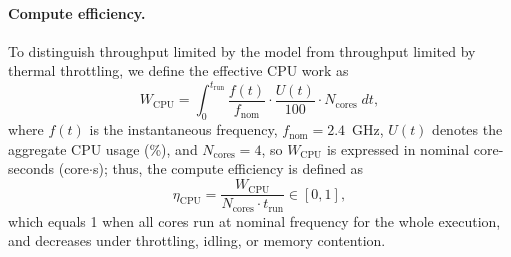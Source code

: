 \documentclass[acmsmall,natbib=false]{acmart}
\begin{document}
\paragraph{Compute efficiency.}
To distinguish throughput limited by the model from throughput limited by
thermal throttling, we define the effective CPU work as
\begin{equation}
  W_{\mathrm{CPU}} = \int_{0}^{t_{\mathrm{run}}} \frac{f(t)}{f_{\mathrm{nom}}}
  \cdot \frac{U(t)}{100} \cdot N_{\mathrm{cores}}\;dt ,
\end{equation}
where $f(t)$ is the instantaneous frequency, $f_{\mathrm{nom}}=2.4$~GHz,
$U(t)$ denotes the aggregate CPU usage (\%), and $N_{\mathrm{cores}}=4$, so
$W_{\mathrm{CPU}}$ is expressed in nominal core-seconds (core$\cdot$s); thus, the compute
efficiency is defined as
\begin{equation}
  \eta_{\mathrm{CPU}} = \frac{W_{\mathrm{CPU}}}{N_{\mathrm{cores}} \cdot
  t_{\mathrm{run}}} \in [0,1],
  \label{eq:eta}
\end{equation}
which equals 1 when all cores run at nominal frequency for the whole execution, and
decreases under throttling, idling, or memory contention.
\end{document}
